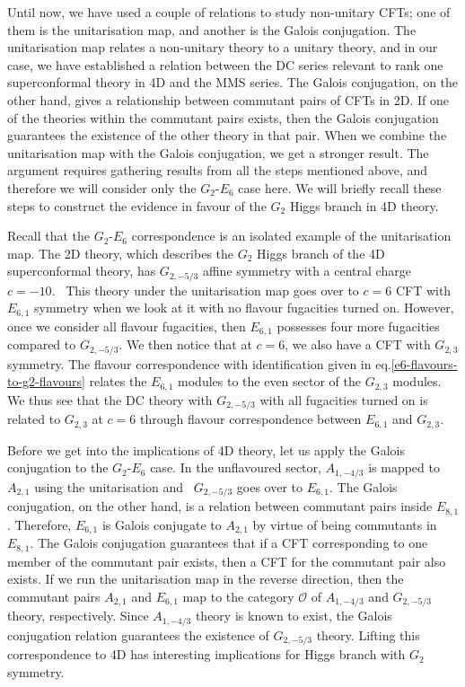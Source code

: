 \documentclass[a4paper,12pt]{article}
\begin{document}
Until now, we have used a couple of relations to study non-unitary CFTs; one of them is the unitarisation map, and another is the Galois conjugation. The unitarisation map relates a non-unitary theory to a unitary theory, and in our case, we have established a relation between the DC series relevant to rank one superconformal theory in 4D and the MMS series. The Galois conjugation, on the other hand, gives a relationship between commutant pairs of CFTs in 2D. If one of the theories within the commutant pairs exists, then the Galois conjugation guarantees the existence of the other theory in that pair. When we combine the unitarisation map with the Galois conjugation, we get a stronger result. The argument requires gathering results from all the steps mentioned above, and therefore we will consider only the $G_2$-$E_6$ case here. We will briefly recall these steps to construct the evidence in favour of the $G_2$ Higgs branch in 4D theory.

Recall that the $G_2$-$E_6$ correspondence is an isolated example of the unitarisation map. The 2D theory, which describes the $G_2$ Higgs branch of the 4D superconformal theory, has $G_{2,-5/3}$ affine symmetry with a central charge $c=-10$.  This theory under the unitarisation map goes over to $c=6$ CFT with $E_{6,1}$ symmetry when we look at it with no flavour fugacities turned on. However, once we consider all flavour fugacities, then $E_{6,1}$ possesses four more fugacities compared to $G_{2,-5/3}$. We then notice that at $c=6$, we also have a CFT with $G_{2,3}$ symmetry. The flavour correspondence with identification given in eq.\eqref{e6-flavours-to-g2-flavours} relates the $E_{6,1}$ modules to the even sector of the $G_{2,3}$ modules. We thus see that the DC theory with $G_{2,-5/3}$ with all fugacities turned on is related to $G_{2,3}$ at $c=6$ through flavour correspondence between $E_{6,1}$ and $G_{2,3}$.

Before we get into the implications of 4D theory, let us apply the Galois conjugation to the $G_2$-$E_6$ case. In the unflavoured sector, $A_{1,-4/3}$ is mapped to $A_{2,1}$ using the unitarisation and  $G_{2,-5/3}$ goes over to $E_{6,1}$. The Galois conjugation, on the other hand, is a relation between commutant pairs inside $E_{8,1}$. Therefore, $E_{6,1}$ is Galois conjugate to $A_{2,1}$ by virtue of being commutants in $E_{8,1}$. The Galois conjugation guarantees that if a CFT corresponding to one member of the commutant pair exists, then a CFT for the commutant pair also exists. If we run the unitarisation map in the reverse direction, then the commutant pairs $A_{2,1}$ and $E_{6,1}$ map to the category $\mathcal{O}$ of $A_{1,-4/3}$ and $G_{2,-5/3}$ theory, respectively. Since $A_{1,-4/3}$ theory is known to exist, the Galois conjugation relation guarantees the existence of $G_{2,-5/3}$ theory. Lifting this correspondence to 4D has interesting implications for Higgs branch with $G_2$ symmetry.
\end{document}
